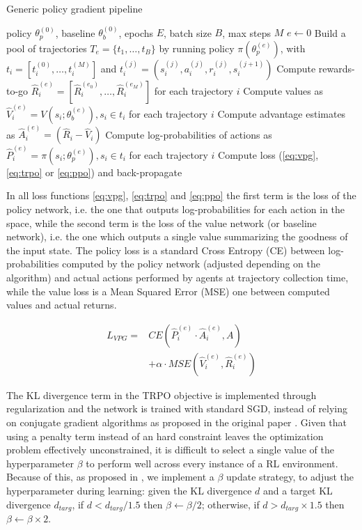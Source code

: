 \documentclass{article}
\begin{document}
\begin{algorithm}[h]
  \caption{Generic policy gradient pipeline}
  \label{alg:pg}
  \begin{algorithmic}[1]
    \Require policy $\theta_p^{(0)}$, baseline $\theta_b^{(0)}$, epochs $E$, batch size $B$, max steps $M$
    \State $e \gets 0$
      \State Build a pool of trajectories $T_e=\{t_1,\dots,t_B\}$ by running policy $\pi(\theta_p^{(e)})$, with $t_i=[t_i^{(0)},\dots,t_i^{(M)}]$ and $t_i^{(j)}=(s_i^{(j)}, a_i^{(j)}, r_i^{(j)}, s_i^{(j+1)})$
      \State Compute rewards-to-go $\hat{R}_i^{(e)}=[\hat{R}_i^{(e_0)}, \dots, \hat{R}_i^{(e_M)}]$ for each trajectory $i$
      \State Compute values as $\hat{V}_i^{(e)}=V(s_i;\theta_b^{(e)}), s_i \in t_i$ for each trajectory $i$
      \State Compute advantage estimates as $\hat{A}_i^{(e)}=(\hat{R}_i-\hat{V}_i)$
      \State Compute log-probabilities of actions as $\hat{P}_i^{(e)}=\pi(s_i;\theta_p^{(e)}), s_i \in t_i$ for each trajectory $i$
      \State Compute loss (\ref{eq:vpg}, \ref{eq:trpo} or \ref{eq:ppo}) and back-propagate
    \EndWhile
  \end{algorithmic}
\end{algorithm}

In all loss functions \ref{eq:vpg}, \ref{eq:trpo} and \ref{eq:ppo} the first term is the loss of the policy network, i.e. the one that outputs log-probabilities for each action in the space, while the second term is the loss of the value network (or baseline network), i.e. the one which outputs a single value summarizing the goodness of the input state. The policy loss is a standard Cross Entropy (CE) between log-probabilities computed by the policy network (adjusted depending on the algorithm) and actual actions performed by agents at trajectory collection time, while the value loss is a Mean Squared Error (MSE) one between computed values and actual returns.

\begin{equation}
  \label{eq:vpg}
  \begin{aligned}
    L_{VPG}={} & CE\left(\hat{P}_i^{(e)}\cdot \hat{A}_i^{(e)}, A\right) \\
    & + \alpha\cdot MSE\left(\hat{V}_i^{(e)}, \hat{R}_i^{(e)}\right)
  \end{aligned}
\end{equation}

The KL divergence term in the TRPO objective is implemented through regularization and the network is trained with standard SGD, instead of relying on conjugate gradient algorithms as proposed in the original paper \cite{trpo}. Given that using a penalty term instead of an hard constraint leaves the optimization problem effectively unconstrained, it is difficult to select a single value of the hyperparameter $\beta$ to perform well across every instance of a RL environment. Because of this, as proposed in \cite{ppo}, we implement a $\beta$ update strategy, to adjust the hyperparameter during learning: given the KL divergence $d$ and a target KL divergence $d_{targ}$, if $d<d_{targ}/1.5$ then $\beta\leftarrow\beta/2$; otherwise, if $d>d_{targ}\times 1.5$ then $\beta\leftarrow\beta\times 2$.
\end{document}
